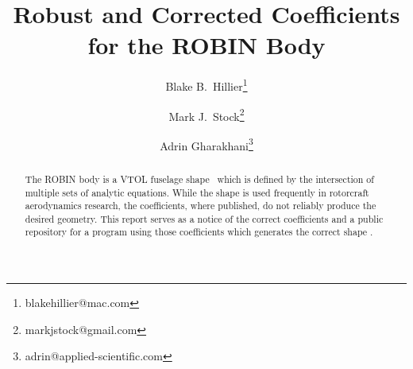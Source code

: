 \documentclass{ahs}
\begin{document}
\title{Robust and Corrected Coefficients for the ROBIN Body}

\author{Blake B.~Hillier\thanks{blakehillier@mac.com}}
\author{Mark J.~Stock\thanks{markjstock@gmail.com}}
\author{Adrin Gharakhani\thanks{adrin@applied-scientific.com}}

\maketitle

\begin{abstract}
The ROBIN body is a VTOL fuselage shape~
which is defined by the intersection of multiple sets of analytic equations.
While the shape is used frequently in rotorcraft aerodynamics research, the coefficients,
where published, do not reliably produce the desired geometry.
This report serves as a notice of the correct coefficients and a public repository
for a program using those coefficients which generates the correct shape .
\end{abstract}

\begin{nomenclature}[$C_{p}$]
\end{nomenclature}
\end{document}
